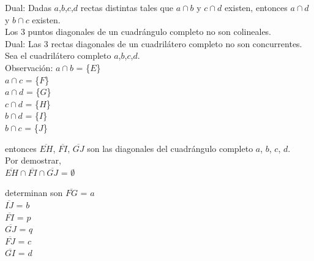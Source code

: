 \documentclass[12pt]{book}
\theoremstyle{definition}
\begin{document}
  
  Dual: Dadas $a$,$b$,$c$,$d$ rectas distintas tales que $a \cap b$ y $c \cap d$
  existen, entonces $a \cap d$ y $b \cap c$ existen.\\

  Los 3 puntos diagonales de un cuadrángulo completo no son colineales.\\
  Dual: Las 3 rectas diagonales de un cuadrilátero completo no son concurrentes.\\
    Sea el cuadrilátero completo $a$,$b$,$c$,$d$.\\
    Observación:
      $a \cap b$ = \{$E$\}\\
      $a \cap c$ = \{$F$\}\\
      $a \cap d$ = \{$G$\}\\
      $c \cap d$ = \{$H$\}\\
      $b \cap d$ = \{$I$\}\\
      $b \cap c$ = \{$J$\}

    entonces $\overline{EH}$, $\overline{FI}$, $\overline{GJ}$ son las
    diagonales del cuadrángulo completo $a$, $b$, $c$, $d$.\\

    Por demostrar,\\
      $\overline{EH} \cap \overline{FI} \cap \overline{GJ}$ = $\emptyset$

    determinan son
        $\overline{FG}$ = $a$\\
        $\overline{IJ}$ = $b$\\
        $\overline{FI}$ = $p$\\
        $\overline{GJ}$ = $q$\\
        $\overline{FJ}$ = $c$\\
        $\overline{GI}$ = $d$\\
\end{document}
